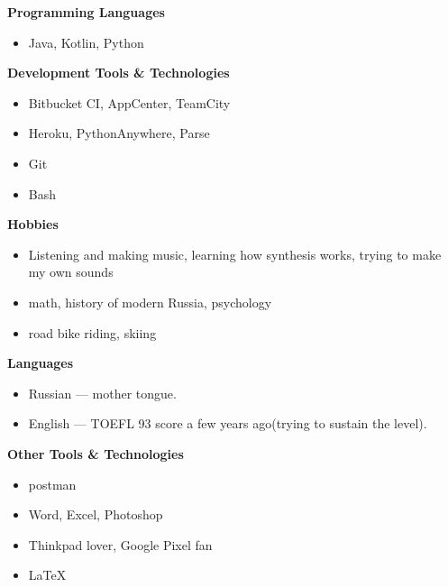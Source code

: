 \documentclass[11pt]{article}
\newcommand\CvBigSkipLength{1em}
\newcommand\CvSkip[1]{\vspace{#1}}
\newcommand\CvBigSkip{\CvSkip{\CvBigSkipLength}}
\newcommand\CvSectionHeader[1]{\CvBigSkip\textbf{#1}\CvBigSkip}
\begin{document}
\begin{minipage}[t]{.5\linewidth}
  \CvSectionHeader{Programming Languages}

  \begin{itemize}
    \item Java, Kotlin, Python
  \end{itemize}

  \CvSectionHeader{Development Tools \& Technologies}

  \begin{itemize}
    \item Bitbucket CI, AppCenter, TeamCity
    \item Heroku, PythonAnywhere, Parse
    \item Git
   \item Bash
  \end{itemize}

  \CvSectionHeader{Hobbies}

  \begin{itemize}
    \item Listening and making music, learning how synthesis works, trying to make my own sounds
    \item math, history of modern Russia, psychology
   \item road bike riding, skiing
  \end{itemize}
\end{minipage}
\begin{minipage}[t]{.5\linewidth}
  \CvSectionHeader{Languages}

  \begin{itemize}
    \item Russian --- mother tongue.
    \item English --- TOEFL 93 score a few years ago(trying to sustain the level).
  \end{itemize}

  \CvSectionHeader{Other Tools \& Technologies}

  \begin{itemize}
    \item postman
   \item Word, Excel, Photoshop
    \item Thinkpad lover, Google Pixel fan
    \item \LaTeX
  \end{itemize}
\end{minipage}
\end{document}
